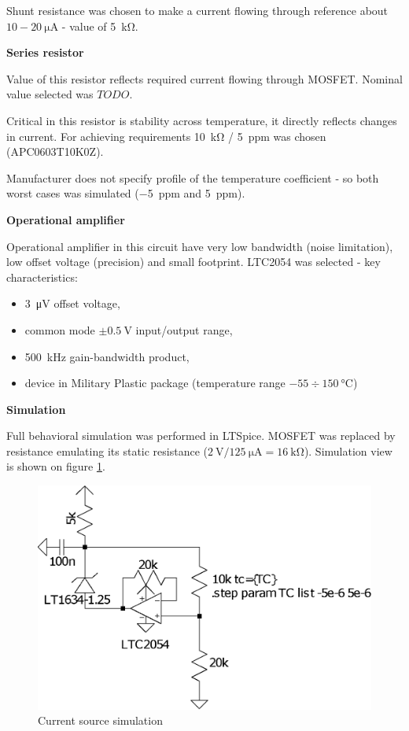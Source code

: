         Shunt resistance was chosen to make a current flowing through reference about $10-\SI{20}{\micro\ampere}$ - value of \SI{5}{\kilo\ohm}.

        \bigskip \textbf{Series resistor}

        Value of this resistor reflects required current flowing through MOSFET. Nominal value selected was $TODO$.

        Critical in this resistor is stability across temperature, it directly reflects changes in current. For achieving requirements \SI{10}{\kilo\ohm} / \SI{5}{ppm} was chosen (APC0603T10K0Z).

        Manufacturer does not specify profile of the temperature coefficient - so both worst cases was simulated (\SI{-5}{ppm} and \SI{5}{ppm}).

        \bigskip \textbf{Operational amplifier}

        Operational amplifier in this circuit have very low bandwidth (noise limitation), low offset voltage (precision) and small footprint. LTC2054 was selected - key characteristics:
        \begin{itemize}
            \item \SI{3}{\micro\volt} offset voltage,
            \item common mode $\pm \SI{0.5}{\volt}$ input/output range,
            \item \SI{500}{\kilo\hertz} gain-bandwidth product,
            \item device in Military Plastic package (temperature range $-55 \div \SI{150}{\degreeCelsius}$)
        \end{itemize}

        \bigskip \textbf{Simulation}

        Full behavioral simulation was performed in LTSpice. MOSFET was replaced by resistance emulating its static resistance ($\SI{2}{\volt}/\SI{125}{\micro\ampere} = \SI{16}{\kilo\ohm}$). Simulation view is shown on figure \ref{current_source_simulation}.

        \begin{figure}[H]
            \centering
            \includegraphics[width=0.5\paperwidth]{img/06/current_source.eps}
            \caption{Current source simulation}
            \label{current_source_simulation}
        \end{figure}

